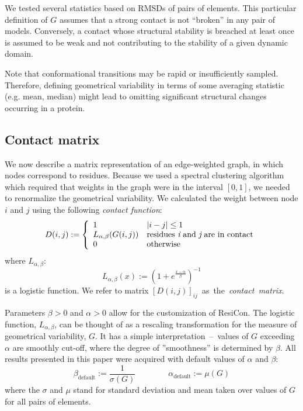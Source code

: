 We tested several statistics based on RMSDs of pairs of elements.
This particular definition of $G$ assumes that a strong contact is not ``broken'' in any pair of models.
Conversely, a contact whose structural stability is breached at least once is assumed to be weak and not contributing to the stability of a given dynamic domain.

Note that conformational transitions may be rapid or insufficiently sampled.
Therefore, defining geometrical variability in terms of some averaging statistic (e.g. mean, median) might lead to omitting significant structural changes occurring in a protein.

\subsection*{Contact matrix}
We now describe a matrix representation of an edge-weighted graph, in which nodes correspond to residues.
Because we used a spectral clustering algorithm which required that weights in the graph were in the interval $[0,1]$, we needed to renormalize the geometrical variability.
We calculated the weight between node $i$ and $j$ using the following \emph{contact function}:
\begin{displaymath}
D(i,j) := \left\{ \begin{array}{ll}
1&  |i-j| \leq 1 \\
L_{\alpha,\beta}(G(i,j))& \text{residues {\it i} and {\it j} are in contact} \\
0& \textrm{otherwise}
\end{array} \right .
\end{displaymath}
where $L_{\alpha,\beta}$:
$$
L_{\alpha,\beta}(x):= \left ( 1 + e^{\frac{x-\alpha}{\beta} } \right )^{-1}
$$
is a logistic function.
We refer to matrix $[D(i,j)]_{ij}$~as~the~\emph{contact~matrix}.

Parameters $\beta>0$ and $\alpha>0$ allow for the customization of ResiCon.
The logistic function, $L_{\alpha,\beta}$, can be thought of as a rescaling transformation for the measure of geometrical variability, $G$.
It has a simple interpretation~--~values of $G$ exceeding $\alpha$ are smoothly cut-off, where the degree of ''smoothness'' is determined by $\beta$.
All results presented in this paper were acquired with default values of $\alpha$ and $\beta$:
\begin{equation}
\beta_{\text{default}} := \frac{1}{\sigma(G)} \qquad\qquad  \alpha_{\text{default}} := \mu(G)
\label{default}
\end{equation}
where the $\sigma$ and $\mu$ stand for standard deviation and mean taken over values of $G$ for all pairs of elements.

